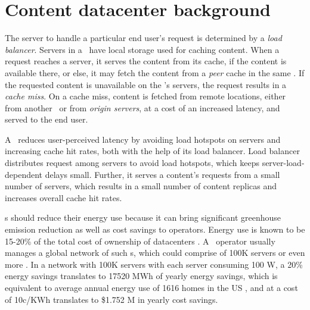
\section{Content datacenter background}
\label{sec:shrink-background}


The server to handle a particular end user's request is determined by a \emph{load balancer}. Servers in a \cdc\ have local storage used for caching content.  When a request reaches a server, it serves the content from its cache, if the content is available there, or else, it may fetch the content from a \emph{peer} cache in the same \cdc. If the requested content is unavailable on the \cdc's servers, the request results in a \emph{cache miss}. On a cache miss, content is fetched from remote locations, either from another \cdc\ or from \emph{origin servers}, at a cost of an increased latency, and served to the end user.


A  \cdc\ reduces user-perceived latency by avoiding load hotspots on servers and increasing cache hit rates, both with the help of its load balancer. Load balancer distributes request among servers to avoid load hotspots, which keeps server-load-dependent delays small. Further, it serves a content's requests from a small number of servers, which results in a small number of content replicas and increases overall cache hit rates.


\cdc s should reduce their energy use because it can bring significant greenhouse emission reduction as well as cost savings to operators. Energy use is known to be 15-20\% of the total cost of ownership of datacenters \cite{GreenbergCost, rasmussen2011determining, power-cost}. A \cdc\ operator usually manages a global network of such \cdc s, which could comprise of 100K servers or even more \cite{akamai-facts}. In a network with 100K servers with each server consuming 100 W,  a 20\% energy savings translates to 17520 MWh of yearly energy savings, which is equivalent to average annual energy use of 1616 homes in the US \cite{eia}, and at a cost of 10c/KWh translates to \$1.752 M in yearly cost savings.

